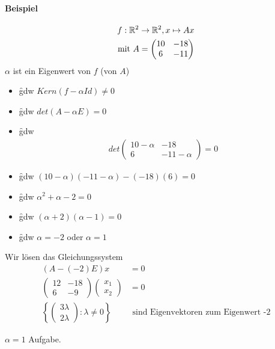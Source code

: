 \paragraph{Beispiel}
\begin{align}
f: \mathbb{R}^2 \rightarrow \mathbb{R}^2, x \mapsto Ax \\
\text{mit } A = \begin{pmatrix} 10 & -18 \\ 6 & -11 \end{pmatrix}
\end{align}
$\alpha$ ist ein Eigenwert von $f$ (von $A$)
\begin{itemize}
 \item \f{gdw} $Kern(f- \alpha Id) \neq 0$ 
 \item \f{gdw} $det(A - \alpha E) = 0$
 \item \f{gdw} 
 \begin{align}
  det  \begin{pmatrix} 10- \alpha & -18 \\ 6 & -11- \alpha \end{pmatrix} = 0
 \end{align}
 \item \f{gdw} $(10-\alpha)(-11-\alpha)-(-18)(6) = 0$
 \item \f{gdw} $\alpha^2 + \alpha -2 = 0$
 \item \f{gdw} $(\alpha + 2)(\alpha -1) = 0$
 \item \f{gdw} $\alpha = -2$ oder $\alpha = 1$
\end{itemize}
Wir lösen das Gleichungssystem
\begin{align}
(A-(-2)E)x &= 0 \\
\begin{pmatrix} 12 & -18 \\ 6 & -9 \end{pmatrix} \begin{pmatrix} x_1 \\ x_2 \end{pmatrix} &= 0 \\
\left\{ \begin{pmatrix} 3 \lambda \\ 2 \lambda \end{pmatrix}: \lambda \neq 0 \right\} &\text{ sind Eigenvektoren zum Eigenwert -2}
\end{align}

$\alpha = 1$ Aufgabe.

